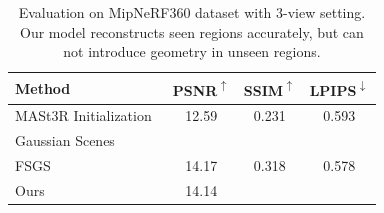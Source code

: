 \begin{table}[ht!]
    \centering
    \footnotesize
    \setlength{\tabcolsep}{2pt}
    \begin{tabular}{lccc}
    \toprule
    Method & PSNR\textsuperscript{$\uparrow$} & SSIM\textsuperscript{$\uparrow$} & LPIPS\textsuperscript{$\downarrow$}\\
    \midrule
 MASt3R Initialization~\cite{GaussianScenes} & 12.59 & 0.231 & 0.593 \\ 
 Gaussian Scenes~\cite{GaussianScenes} & \cellcolor{tab_color!10}{13.81} & \cellcolor{tab_color!10}{0.265} & \cellcolor{tab_color!30}{0.547} \\ 
 FSGS~\cite{fsgs} & \cellcolor{tab_color!50}14.17 & \cellcolor{tab_color!50}0.318 & \cellcolor{tab_color!10}0.578 \\
 Ours & \cellcolor{tab_color!30}14.14 & \cellcolor{tab_color!30}{0.310} & \cellcolor{tab_color!50}{0.523}\\
    \bottomrule
    \end{tabular}
    \caption{Evaluation on MipNeRF360 dataset with 3-view setting. Our model reconstructs seen regions accurately, but can not introduce geometry in unseen regions.}
    \label{tab:evaluation_mipnerf360_3view}
\end{table}